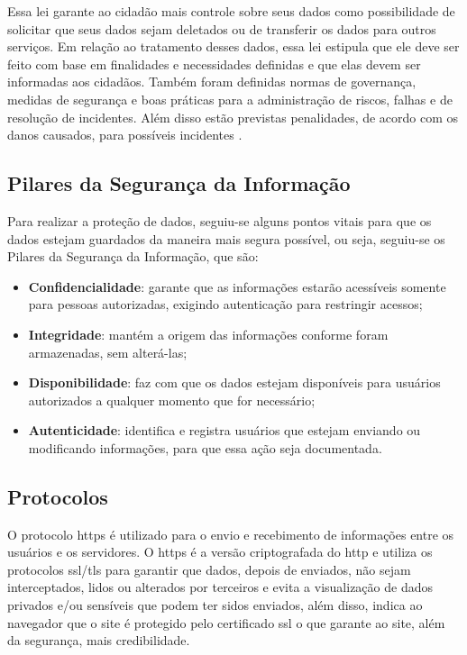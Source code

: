 \documentclass[
    12pt,               %
    openright,          %
    oneside,
    a4paper,            %
    english,            %
    brazil              %
    ]{ifsp-spo-inf-ctds} %
\begin{document}
Essa lei garante ao cidadão mais controle sobre seus dados como possibilidade de solicitar que seus dados sejam deletados ou de transferir os dados para outros serviços. Em relação ao tratamento desses dados, essa lei estipula que ele deve ser feito com base em finalidades e necessidades definidas e que elas devem ser informadas aos cidadãos. Também foram definidas normas de governança, medidas de segurança e boas práticas para a administração de riscos, falhas e de resolução de incidentes. Além disso estão previstas penalidades, de acordo com os danos causados, para possíveis incidentes \cite{lgpd-serpro:2018}.

\subsection {Pilares da Segurança da Informação}
Para realizar a proteção de dados, seguiu-se alguns pontos vitais para que os dados estejam guardados da maneira mais segura possível, ou seja, seguiu-se os Pilares da Segurança da Informação, que são:

\begin{itemize}
\item \textbf{Confidencialidade}: garante que as informações estarão acessíveis somente para pessoas autorizadas, exigindo autenticação para restringir acessos;
\item \textbf{Integridade}: mantém a origem das informações conforme foram armazenadas, sem alterá-las;
\item \textbf{Disponibilidade}: faz com que os dados estejam disponíveis para usuários autorizados a qualquer momento que for necessário;
\item \textbf{Autenticidade}: identifica e registra usuários que estejam enviando ou modificando informações, para que essa ação seja documentada.
\end{itemize}

\subsection {Protocolos}
O protocolo \ac{https} é utilizado para o envio e recebimento de informações entre os usuários e os servidores. O \ac{https} é a versão criptografada do \ac{http} e utiliza os protocolos \ac{ssl}/\ac{tls} para garantir que dados, depois de enviados, não sejam interceptados, lidos ou alterados por terceiros e evita a visualização de dados privados e/ou sensíveis que podem ter sidos enviados, além disso, indica ao navegador que o site é protegido pelo certificado \ac{ssl} o que garante ao site, além da segurança, mais credibilidade. 
\end{document}
